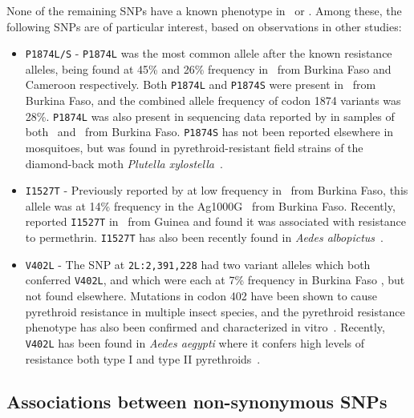 \begin{refsection}
None of the remaining SNPs have a known phenotype in \agam\ or \acol.
%
Among these, the following SNPs are of particular interest, based on observations in other studies:
%
\begin{itemize}
    \item \texttt{P1874L/S} - \texttt{P1874L} was the most common allele after the known resistance alleles, being found at 45\% and 26\% frequency in \agam\ from Burkina Faso and Cameroon respectively.
    Both \texttt{P1874L} and \texttt{P1874S} were present in \acol\ from Burkina Faso, and the combined allele frequency of codon 1874 variants was 28\%.
    \texttt{P1874L} was also present in sequencing data reported by \textcite{Jones2012} in samples of both \agam\ and \acol\ from Burkina Faso.
    \texttt{P1874S} has not been reported elsewhere in mosquitoes, but was found in pyrethroid-resistant field strains of the diamond-back moth \textit{Plutella xylostella}~\parencite{Sonoda2010}.
    \item \texttt{I1527T} - Previously reported by \textcite{Jones2012} at low frequency in \acol\ from Burkina Faso, this allele was at 14\% frequency in the Ag1000G \acol\ from Burkina Faso.
    Recently, \textcite{Collins2019} reported \texttt{I1527T} in \agam\ from Guinea and found it was associated with resistance to permethrin.
    \texttt{I1527T} has also been recently found in \textit{Aedes albopictus}~\parencite{Auteri2018}.
    \item \texttt{V402L} - The SNP at \texttt{2L:2,391,228} had two variant alleles which both conferred \texttt{V402L}, and which were each at 7\% frequency in Burkina Faso \acol, but not found elsewhere.
    Mutations in codon 402 have been shown to cause pyrethroid resistance in multiple insect species, and the pyrethroid resistance phenotype has also been confirmed and characterized in vitro~\parencite{Dong2014}.
    Recently, \texttt{V402L} has been found in \textit{Aedes aegypti} where it confers high levels of resistance both type I and type II pyrethroids~\parencite{Haddi2017,VillanuevaSegura2020}.
\end{itemize}
%


\subsection{Associations between non-synonymous SNPs}\label{subsec:results-ld}



\end{refsection}
